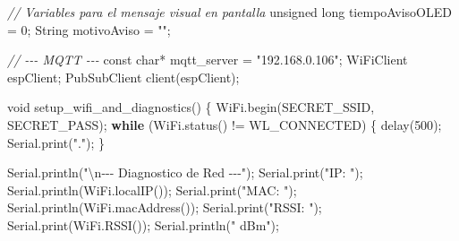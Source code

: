 \documentclass[11pt]{article}
\newenvironment{Shaded}{}{}
\newcommand{\DataTypeTok}[1]{\textcolor[rgb]{0.56,0.13,0.00}{{#1}}}
\newcommand{\DecValTok}[1]{\textcolor[rgb]{0.25,0.63,0.44}{{#1}}}
\newcommand{\StringTok}[1]{\textcolor[rgb]{0.25,0.44,0.63}{{#1}}}
\newcommand{\CommentTok}[1]{\textcolor[rgb]{0.38,0.63,0.69}{\textit{{#1}}}}
\newcommand{\NormalTok}[1]{{#1}}
\newcommand{\SpecialCharTok}[1]{\textcolor[rgb]{0.25,0.44,0.63}{{#1}}}
\newcommand{\ControlFlowTok}[1]{\textcolor[rgb]{0.00,0.44,0.13}{\textbf{{#1}}}}
\newcommand{\OperatorTok}[1]{\textcolor[rgb]{0.40,0.40,0.40}{{#1}}}
\begin{document}
\begin{Shaded}
\begin{Highlighting}[]
\CommentTok{// Variables para el mensaje visual en pantalla}
\DataTypeTok{unsigned} \DataTypeTok{long}\NormalTok{ tiempoAvisoOLED }\OperatorTok{=} \DecValTok{0}\OperatorTok{;}
\NormalTok{String motivoAviso }\OperatorTok{=} \StringTok{""}\OperatorTok{;}

\CommentTok{// {-}{-}{-} MQTT {-}{-}{-}}
\DataTypeTok{const} \DataTypeTok{char}\OperatorTok{*}\NormalTok{ mqtt\_server }\OperatorTok{=} \StringTok{"192.168.0.106"}\OperatorTok{;}
\NormalTok{WiFiClient espClient}\OperatorTok{;}
\NormalTok{PubSubClient client}\OperatorTok{(}\NormalTok{espClient}\OperatorTok{);}

\DataTypeTok{void}\NormalTok{ setup\_wifi\_and\_diagnostics}\OperatorTok{()} \OperatorTok{\{}
\NormalTok{  WiFi}\OperatorTok{.}\NormalTok{begin}\OperatorTok{(}\NormalTok{SECRET\_SSID}\OperatorTok{,}\NormalTok{ SECRET\_PASS}\OperatorTok{);}
  \ControlFlowTok{while} \OperatorTok{(}\NormalTok{WiFi}\OperatorTok{.}\NormalTok{status}\OperatorTok{()} \OperatorTok{!=}\NormalTok{ WL\_CONNECTED}\OperatorTok{)} \OperatorTok{\{}
\NormalTok{    delay}\OperatorTok{(}\DecValTok{500}\OperatorTok{);}
\NormalTok{    Serial}\OperatorTok{.}\NormalTok{print}\OperatorTok{(}\StringTok{"."}\OperatorTok{);}
  \OperatorTok{\}}

\NormalTok{  Serial}\OperatorTok{.}\NormalTok{println}\OperatorTok{(}\StringTok{"}\SpecialCharTok{\textbackslash{}n}\StringTok{{-}{-}{-} Diagnostico de Red {-}{-}{-}"}\OperatorTok{);}
\NormalTok{  Serial}\OperatorTok{.}\NormalTok{print}\OperatorTok{(}\StringTok{"IP: "}\OperatorTok{);}\NormalTok{ Serial}\OperatorTok{.}\NormalTok{println}\OperatorTok{(}\NormalTok{WiFi}\OperatorTok{.}\NormalTok{localIP}\OperatorTok{());}
\NormalTok{  Serial}\OperatorTok{.}\NormalTok{print}\OperatorTok{(}\StringTok{"MAC: "}\OperatorTok{);}\NormalTok{ Serial}\OperatorTok{.}\NormalTok{println}\OperatorTok{(}\NormalTok{WiFi}\OperatorTok{.}\NormalTok{macAddress}\OperatorTok{());}
\NormalTok{  Serial}\OperatorTok{.}\NormalTok{print}\OperatorTok{(}\StringTok{"RSSI: "}\OperatorTok{);}\NormalTok{ Serial}\OperatorTok{.}\NormalTok{print}\OperatorTok{(}\NormalTok{WiFi}\OperatorTok{.}\NormalTok{RSSI}\OperatorTok{());}\NormalTok{ Serial}\OperatorTok{.}\NormalTok{println}\OperatorTok{(}\StringTok{" dBm"}\OperatorTok{);}


\end{Highlighting}
\end{Shaded}
\end{document}
